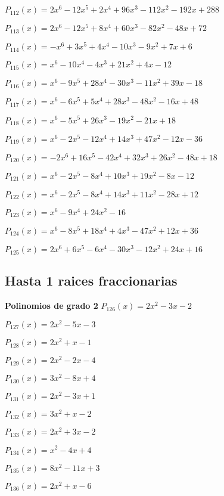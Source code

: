 \subitem $P_{112}(x) = 2x^6 - 12x^5 + 2x^4 + 96x^3 - 112x^2 - 192x + 288$

\subitem $P_{113}(x) = 2x^6 - 12x^5 + 8x^4 + 60x^3 - 82x^2 - 48x + 72$

\subitem $P_{114}(x) = -x^6 + 3x^5 + 4x^4 - 10x^3 - 9x^2 + 7x + 6$

\subitem $P_{115}(x) = x^6 - 10x^4 - 4x^3 + 21x^2 + 4x - 12$

\subitem $P_{116}(x) = x^6 - 9x^5 + 28x^4 - 30x^3 - 11x^2 + 39x - 18$

\subitem $P_{117}(x) = x^6 - 6x^5 + 5x^4 + 28x^3 - 48x^2 - 16x + 48$

\subitem $P_{118}(x) = x^6 - 5x^5 + 26x^3 - 19x^2 - 21x + 18$

\subitem $P_{119}(x) = x^6 - 2x^5 - 12x^4 + 14x^3 + 47x^2 - 12x - 36$

\subitem $P_{120}(x) = -2x^6 + 16x^5 - 42x^4 + 32x^3 + 26x^2 - 48x + 18$

\subitem $P_{121}(x) = x^6 - 2x^5 - 8x^4 + 10x^3 + 19x^2 - 8x - 12$

\subitem $P_{122}(x) = x^6 - 2x^5 - 8x^4 + 14x^3 + 11x^2 - 28x + 12$

\subitem $P_{123}(x) = x^6 - 9x^4 + 24x^2 - 16$

\subitem $P_{124}(x) = x^6 - 8x^5 + 18x^4 + 4x^3 - 47x^2 + 12x + 36$

\subitem $P_{125}(x) = 2x^6 + 6x^5 - 6x^4 - 30x^3 - 12x^2 + 24x + 16$

\subsection{Hasta 1 raices fraccionarias}
\textbf{Polinomios de grado 2} 
\subitem $P_{126}(x) = 2x^2 - 3x - 2$

\subitem $P_{127}(x) = 2x^2 - 5x - 3$

\subitem $P_{128}(x) = 2x^2 + x - 1$

\subitem $P_{129}(x) = 2x^2 - 2x - 4$

\subitem $P_{130}(x) = 3x^2 - 8x + 4$

\subitem $P_{131}(x) = 2x^2 - 3x + 1$

\subitem $P_{132}(x) = 3x^2 + x - 2$

\subitem $P_{133}(x) = 2x^2 + 3x - 2$

\subitem $P_{134}(x) = x^2 - 4x + 4$

\subitem $P_{135}(x) = 8x^2 - 11x + 3$

\subitem $P_{136}(x) = 2x^2 + x - 6$

